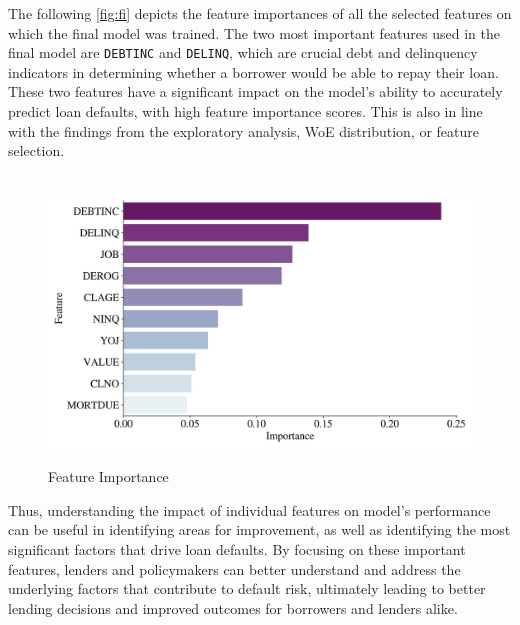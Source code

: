 The following \autoref{fig:fi} depicts the feature importances of all the selected features on which the final model was trained.
The two most important features used in the final model are \texttt{DEBTINC} and \texttt{DELINQ}, which are crucial debt and delinquency indicators in determining whether a borrower would be able to repay their loan. These two features have a significant impact on the model's ability to accurately predict loan defaults, with high feature importance scores. This is also in line with the findings from the exploratory analysis, WoE distribution, or feature selection.
\begin{figure}[H]
\centering
\caption{Feature Importance}\vspace{0.5em}
\label{fig:fi}\
\includegraphics[width=140mm]{Figures/Feature_Importances.jpg}

\vspace{-1em}
\end{figure}

Thus, understanding the impact of individual features on model's performance can be useful in identifying areas for improvement, as well as identifying the most significant factors that drive loan defaults.
By focusing on these important features, lenders and policymakers can better understand and address the underlying factors that contribute to default risk, ultimately leading to better lending decisions and improved outcomes for borrowers and lenders alike.


